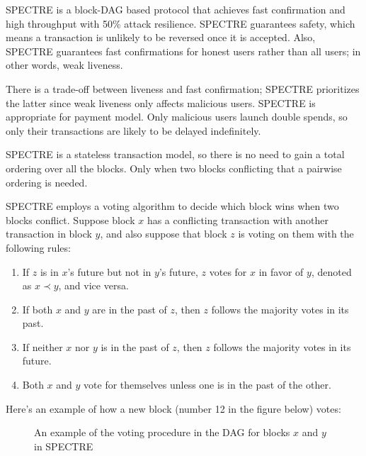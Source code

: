 \documentclass[a4paper,11pt]{article}
\begin{document}
SPECTRE is a block-DAG based protocol that achieves fast confirmation and high
throughput with 50\% attack resilience. SPECTRE guarantees safety, which means a
transaction is unlikely to be reversed once it is accepted. Also, SPECTRE guarantees fast confirmations for honest users rather than all users; in other words, weak liveness.

There is a trade-off between liveness and fast confirmation; SPECTRE prioritizes
the latter since weak liveness only affects malicious users. SPECTRE is appropriate for payment model. Only malicious users launch double spends, so only their
transactions are likely to be delayed indefinitely.

SPECTRE is a stateless transaction model, so there is no need to gain a
total ordering over all the blocks. Only when two blocks conflicting
that a pairwise ordering is needed.

SPECTRE employs a voting algorithm to decide which block wins when two blocks
conflict. Suppose block $x$ has a conflicting transaction with another
transaction in block $y$, and also suppose that block $z$ is voting on them with
the following rules:

\begin{enumerate}
	\item If $z$ is in $x$'s future but not in $y$'s future, $z$ votes for
		$x$ in favor of $y$, denoted as $x \prec y$, and vice versa.
	\item If both $x$ and $y$ are in the past of $z$, then $z$ follows the majority votes in its past.
	\item If neither $x$ nor $y$ is in the past of $z$, then $z$ follows the majority votes in its future.
	\item Both $x$ and $y$ vote for themselves unless one is in the past of
		the other.
\end{enumerate}


Here's an example of how a new block (number 12 in the figure below) votes:

\begin{figure}[h]
	\centerline{%
	}
\caption{An example of the voting procedure in the DAG for blocks $x$ and $y$ in SPECTRE}
\end{figure}
\end{document}
